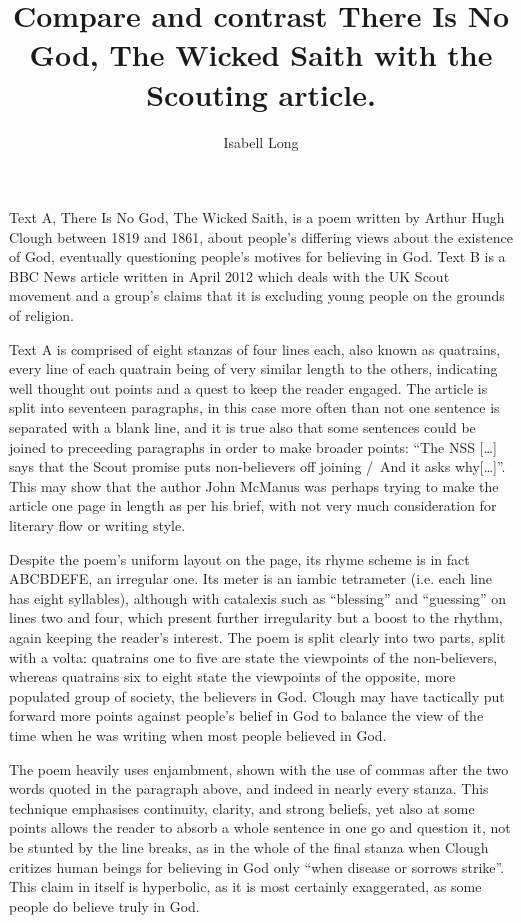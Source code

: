 \documentclass[12pt,a4paper]{article}
\begin{document}
	\title{Compare and contrast There Is No God, The Wicked Saith with the Scouting article.}
	\author{Isabell Long}
	\maketitle
	
	\linenumbers
	Text A, There Is No God, The Wicked Saith, is a poem written by Arthur Hugh Clough between 1819 and 1861, about people's differing views about the existence of God, eventually questioning people's motives for believing in God.  Text B is a BBC News article written in April 2012 which deals with the UK Scout movement and a group's claims that it is excluding young people on the grounds of religion.
	
	Text A is comprised of eight stanzas of four lines each, also known as quatrains, every line of each quatrain being of very similar length to the others, indicating well thought out points and a quest to keep the reader engaged.  The article is split into seventeen paragraphs, in this case more often than not one sentence is separated with a blank line, and it is true also that some sentences could be joined to preceeding paragraphs in order to make broader points: ``The NSS [\ldots] says that the Scout promise puts non-believers off joining \slash\ And it asks why[\ldots]''.  This may show that the author John McManus was perhaps trying to make the article one page in length as per his brief, with not very much consideration for literary flow or writing style.
	
	Despite the poem's uniform layout on the page, its rhyme scheme is in fact ABCBDEFE, an irregular one.  Its meter is an iambic tetrameter (i.e. each line has eight syllables), although with catalexis such as ``blessing'' and ``guessing'' on lines two and four, which present further irregularity but a boost to the rhythm, again keeping the reader's interest.  The poem is split clearly into two parts, split with a volta: quatrains one to five are state the viewpoints of the non-believers, whereas quatrains six to eight state the viewpoints of the opposite, more populated group of society, the believers in God.  Clough may have tactically put forward more points against people's belief in God to balance the view of the time when he was writing when most people believed in God.
	
	The poem heavily uses enjambment, shown with the use of commas after the two words quoted in the paragraph above, and indeed in nearly every stanza.  This technique emphasises continuity, clarity, and strong beliefs, yet also at some points allows the reader to absorb a whole sentence in one go and question it, not be stunted by the line breaks, as in the whole of the final stanza when Clough critizes human beings for believing in God only ``when disease or sorrows strike''.  This claim in itself is hyperbolic, as it is most certainly exaggerated, as some people do believe truly in God.
	
\end{document}
